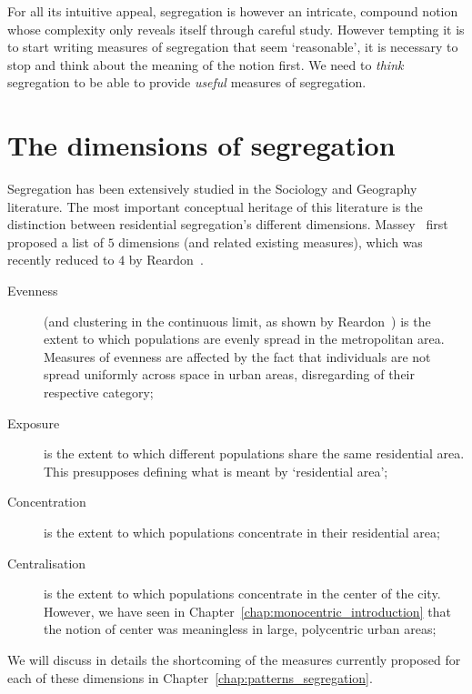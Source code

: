 For all its intuitive appeal, segregation is however an intricate, compound
notion whose complexity only reveals itself through careful study. However
tempting it is to start writing measures of segregation that seem `reasonable',
it is necessary to stop and think about the meaning of the notion first. We need to
\emph{think} segregation to be able to provide \emph{useful} measures of
segregation.


\section{The dimensions of segregation}
\label{sec:the_dimensions_of_segregation}

Segregation has been extensively studied in the Sociology and Geography
literature. The most important conceptual heritage of this literature is the
distinction between residential segregation's different dimensions.
Massey~\cite{Massey:1988} first proposed a list of $5$ dimensions (and related
existing measures), which was recently reduced to $4$ by
Reardon~\cite{Reardon:2004}. 

\begin{description}
    \item[Evenness] (and clustering in the continuous
        limit, as shown by Reardon~\cite{Reardon:2004}) is the extent to which
        populations are evenly spread in the metropolitan area.
        Measures of evenness are affected by the fact that
        individuals are not spread uniformly across space in urban areas,
        disregarding of their respective category;

    \item[Exposure] is the extent to which different
        populations share the same residential area. This presupposes defining
        what is meant by `residential area';

    \item[Concentration] is the extent to which populations concentrate in their
        residential area;

    \item[Centralisation] is the extent to which populations concentrate in the
        center of the city. However, we have seen in
        Chapter~\ref{chap:monocentric_introduction} that the notion of center
        was meaningless in large, polycentric urban areas;
\end{description}

We will discuss in details the shortcoming of the measures currently proposed
for each of these dimensions in Chapter~\ref{chap:patterns_segregation}.


